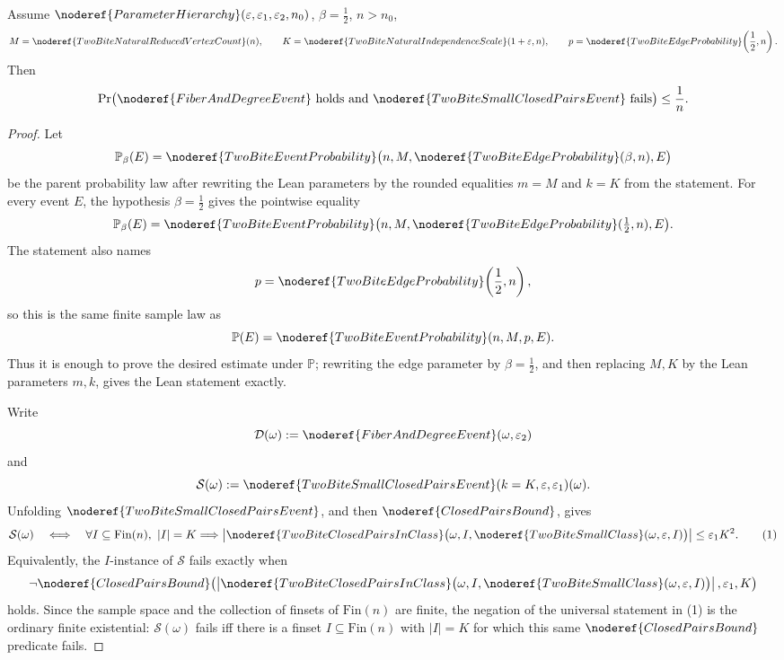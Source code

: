 \begin{lemma}
Assume \(\noderef{ParameterHierarchy}(\varepsilon,\varepsilon_1,\varepsilon_2,
n_0)\), \(\beta=\frac12\), \(n>n_0\),
\[
M=\noderef{TwoBiteNaturalReducedVertexCount}(n),\qquad
K=\noderef{TwoBiteNaturalIndependenceScale}(1+\varepsilon,n),
\qquad
p=\noderef{TwoBiteEdgeProbability}\!\left(\frac12,n\right).
\]
Then
\[
\Pr\bigl(\noderef{FiberAndDegreeEvent}\ \text{holds and }
\noderef{TwoBiteSmallClosedPairsEvent}\ \text{fails}\bigr)\le \frac1n.
\]
\end{lemma}
\begin{proof}
Let
\[
\mathbb P_\beta(E)=
\noderef{TwoBiteEventProbability}
  \bigl(n,M,\noderef{TwoBiteEdgeProbability}(\beta,n),E\bigr)
\]
be the parent probability law after rewriting the Lean parameters by the
rounded equalities \(m=M\) and \(k=K\) from the statement.  For every event
\(E\), the hypothesis \(\beta=\frac12\) gives the pointwise equality
\[
\mathbb P_\beta(E)=
\noderef{TwoBiteEventProbability}
  \bigl(n,M,\noderef{TwoBiteEdgeProbability}(\tfrac12,n),E\bigr).
\]
The statement also names
\[
p=\noderef{TwoBiteEdgeProbability}\!\left(\frac12,n\right),
\]
so this is the same finite sample law as
\[
\mathbb P(E)=
\noderef{TwoBiteEventProbability}(n,M,p,E).
\]
Thus it is enough to prove the desired estimate under \(\mathbb P\); rewriting
the edge parameter by \(\beta=\frac12\), and then replacing \(M,K\) by the
Lean parameters \(m,k\), gives the Lean statement exactly.

Write
\[
\mathcal D(\omega):=\noderef{FiberAndDegreeEvent}(\omega,\varepsilon_2)
\]
and
\[
\mathcal S(\omega):=
\noderef{TwoBiteSmallClosedPairsEvent}
  (k=K,\varepsilon,\varepsilon_1)(\omega).
\]
Unfolding \(\noderef{TwoBiteSmallClosedPairsEvent}\), and then
\(\noderef{ClosedPairsBound}\), gives
\[
\mathcal S(\omega)\quad\Longleftrightarrow\quad
\forall I\subseteq\mathrm{Fin}(n),\ |I|=K\Longrightarrow
\left|\noderef{TwoBiteClosedPairsInClass}
  \bigl(\omega,I,\noderef{TwoBiteSmallClass}(\omega,\varepsilon,I)\bigr)
\right|\le\varepsilon_1K^2. \tag{1}
\]
Equivalently, the \(I\)-instance of \(\mathcal S\) fails exactly when
\[
\neg\noderef{ClosedPairsBound}\!\left(
\left|\noderef{TwoBiteClosedPairsInClass}
  \bigl(\omega,I,\noderef{TwoBiteSmallClass}(\omega,\varepsilon,I)\bigr)
\right|,
\varepsilon_1,K\right)
\]
holds.  Since the sample space and the collection of finsets of
\(\mathrm{Fin}(n)\) are finite, the negation of the universal statement in
(1) is the ordinary finite existential: \(\mathcal S(\omega)\) fails iff
there is a finset \(I\subseteq\mathrm{Fin}(n)\) with \(|I|=K\) for which this
same \(\noderef{ClosedPairsBound}\) predicate fails.


\end{proof}
